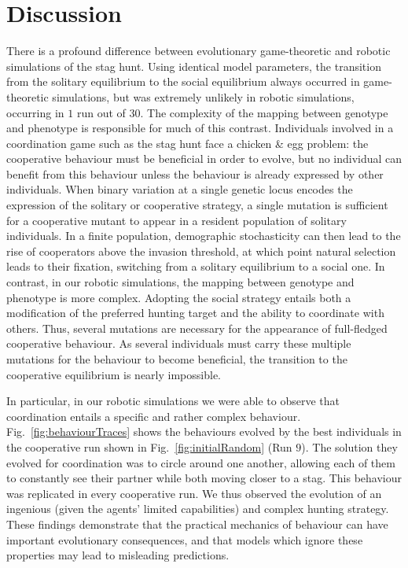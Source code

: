 \section{Discussion}
\label{discussion}
  There is a profound difference between evolutionary game-theoretic and robotic simulations of the stag hunt. Using identical model parameters, the transition from the solitary equilibrium to the social equilibrium always occurred in game-theoretic simulations, but was extremely unlikely in robotic simulations, occurring in $1$ run out of $30$. The complexity of the mapping between genotype and phenotype is responsible for much of this contrast. Individuals involved in a coordination game such as the stag hunt face a chicken \& egg problem: the cooperative behaviour must be beneficial in order to evolve, but no individual can benefit from this behaviour unless the behaviour is already expressed by other individuals. When binary variation at a single genetic locus encodes the expression of the solitary or cooperative strategy, a single mutation is sufficient for a cooperative mutant to appear in a resident population of solitary individuals. In a finite population, demographic stochasticity can then lead to the rise of cooperators above the invasion threshold, at which point natural selection leads to their fixation, switching from a solitary equilibrium to a social one. In contrast, in our robotic simulations, the mapping between genotype and phenotype is more complex. Adopting the social strategy entails both a modification of the preferred hunting target and the ability to coordinate with others. Thus, several mutations are necessary for the appearance of full-fledged cooperative behaviour. As several individuals must carry these multiple mutations for the behaviour to become beneficial, the transition to the cooperative equilibrium is nearly impossible.

  In particular, in our robotic simulations we were able to observe that coordination entails a specific and rather complex behaviour. Fig.~\ref{fig:behaviourTraces} shows the behaviours evolved by the best individuals in the cooperative run shown in Fig.~\ref{fig:initialRandom} (Run $9$). The solution they evolved for coordination was to circle around one another, allowing each of them to constantly see their partner while both moving closer to a stag. This behaviour was replicated in every cooperative run. We thus observed the evolution of an ingenious (given the agents' limited capabilities) and complex hunting strategy. These findings demonstrate that the practical mechanics of behaviour can have important evolutionary consequences, and that models which ignore these properties may lead to misleading predictions.

